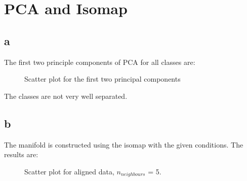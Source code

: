 \documentclass[a4paper,12pt]{article}
\begin{document}
\tableofcontents %
\newpage

\section{PCA and Isomap}
\subsection{a}
The first two principle components of PCA for all classes are:
\begin{figure}[H]
\hfill
{}
\hfill
\caption{Scatter plot for the first two principal components}
\label{fig:a}
\label{41}
\end{figure}

The classes are not very well separated. 

\subsection{b}
The manifold is constructed using the isomap with the given conditions. The results are: 
\begin{figure}[H]
\hfill
{}
\hfill
\caption{Scatter plot for aligned data, $n_{neighbours}$ = 5.}
\label{51}
\end{figure}
\end{document}

